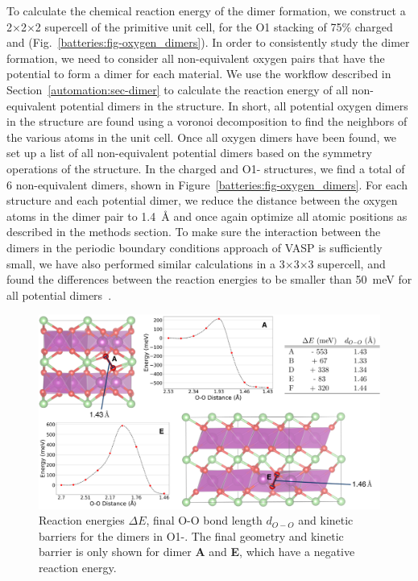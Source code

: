 \begin{refsection}
To calculate the chemical reaction energy of the dimer formation, we construct 
a 2$\times$2$\times$2 supercell of the primitive unit cell, for the O1 stacking of 75\% 
charged  and  
(Fig.~\ref{batteries:fig-oxygen_dimers}). In order to consistently study the 
dimer formation, we need to consider all non-equivalent oxygen pairs that have 
the potential to form a dimer for each material. We use the workflow described 
in Section~\ref{automation:sec-dimer} to calculate the reaction energy of all
non-equivalent potential dimers in the structure. In short, all potential oxygen dimers 
in the structure are found using a voronoi decomposition to find the neighbors 
of the various atoms in the unit cell. Once all oxygen dimers have been found, 
we set up a list of all non-equivalent potential dimers based on the
symmetry operations of the structure. In the charged 
 and O1- structures, we find a total of 6 
non-equivalent dimers, shown in Figure~\ref{batteries:fig-oxygen_dimers}. For 
each structure and each potential dimer, we reduce the distance between the 
oxygen atoms in the dimer pair to 1.4~\si{\angstrom} and once again optimize 
all atomic positions as described in the methods section. To make sure the 
interaction between the dimers in the periodic boundary conditions approach of 
\gls{VASP} is sufficiently small, we have also performed similar calculations in a 
3$\times$3$\times$3 supercell, and found the differences between the reaction energies to be 
smaller than 50~\si{\milli\electronvolt} for all potential 
dimers~\cite{Levi2020}. 
 
\begin{figure}[ht] 
\centering
\captionsetup{width=0.9\linewidth}
\includegraphics[width=\textwidth]{Figures/batteries/dimer_energetics.png} 
\caption{Reaction energies $\Delta E$, final O-O bond length $d_{O-O}$ and 
kinetic barriers for the dimers in O1-. The final geometry 
and kinetic barrier is only shown for dimer \textbf{A} and \textbf{E}, which 
have a negative reaction energy.} 
\label{batteries:fig-Mn_dimers} 
\end{figure} 
 

\end{refsection}
